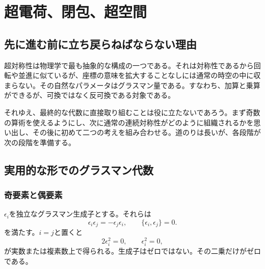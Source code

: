\chapter{超電荷、閉包、超空間}


\section{先に進む前に立ち戻らねばならない理由}

超対称性は物理学で最も抽象的な構成の一つである。それは対称性であるから回転や並進に似ているが、座標の意味を拡大することなしには通常の時空の中に収まらない。その自然なパラメータはグラスマン量である。すなわち、加算と乗算ができるが、可換ではなく反可換である対象である。

それゆえ、最終的な代数に直接取り組むことは役に立たないであろう。まず奇数の算術を使えるようにし、次に通常の連続対称性がどのように組織されるかを思い出し、その後に初めて二つの考えを組み合わせる。道のりは長いが、各段階が次の段階を準備する。

\section{実用的な形でのグラスマン代数}

\subsection{奇要素と偶要素}

\(\epsilon_i\)を独立なグラスマン生成子とする。それらは
\begin{equation}
\epsilon_i\epsilon_j=-\epsilon_j\epsilon_i,
\qquad
\{\epsilon_i,\epsilon_j\}=0.
\end{equation}
を満たす。\(i=j\)と置くと
\begin{equation}
2\epsilon_i^2=0,
\qquad
\epsilon_i^2=0,
\end{equation}
が実数または複素数上で得られる。生成子はゼロではない。その二乗だけがゼロである。

